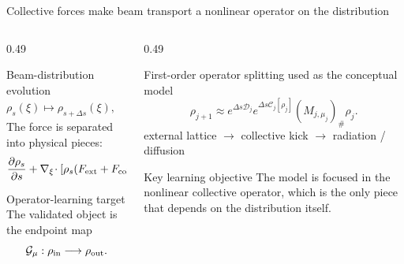 \begin{frame}[t,shrink=5]{Collective forces make beam transport a nonlinear operator on the distribution}
\begin{columns}[T,onlytextwidth]
\begin{column}{0.49\textwidth}
\begin{block}{Beam-distribution evolution}
\[\rho_s(\xi)\longmapsto\rho_{s+\Delta s}(\xi),\quad\xi=(x,p_x,y,p_y,\zeta,\delta).\]
The force is separated into physical pieces:
\[\frac{\partial\rho_s}{\partial s}+\nabla_\xi\!\cdot[\rho_s(F_{\rm ext}+F_{\rm coll}[\rho_s]+F_{\rm rad})]=\frac12\nabla_\xi\nabla_\xi:(D_{\rm rad}\rho_s).\]
\end{block}
\begin{alertblock}{Operator-learning target}
The validated object is the endpoint map\[\mathcal G_\mu:\rho_{\rm in}\longrightarrow\rho_{\rm out}.\]
\end{alertblock}

\end{column}
\begin{column}{0.49\textwidth}
\begin{block}{First-order operator splitting used as the conceptual model}
\[\rho_{j+1}\approx e^{\Delta s\mathcal D_j}e^{\Delta s\mathcal C_j[\rho_j]}(M_{j,\mu_j})_{\#}\rho_j.\]
\scriptsize external lattice $\to$ collective kick $\to$ radiation / diffusion
\end{block}
\begin{alertblock}{Key learning objective}
The model is focused in the nonlinear collective operator, which is the only piece that depends on the distribution itself.
\end{alertblock}

\end{column}
\end{columns}


\end{frame}

